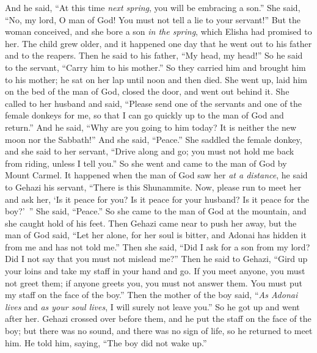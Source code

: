\begin{biblechapter}
\verse And he said, “At this time \textit{next spring}, you will be embracing a son.” She said, “No, my lord, O man of God! You must not tell a lie to your servant!”
\verse But the woman conceived, and she bore a son \textit{in the spring}, which Elisha had promised to her.
 The child grew older, and it happened one day that he went out to his father and to the reapers.
\verse Then he said to his father, “My head, my head!” So he said to the servant, “Carry him to his mother.”
\verse So they carried him and brought him to his mother; he sat on her lap until noon and then died.
\verse She went up, laid him on the bed of the man of God, closed the door, and went out behind it.
\verse She called to her husband and said, “Please send one of the servants and one of the female donkeys for me, so that I can go quickly up to the man of God and return.”
\verse And he said, “Why are you going to him today? It is neither the new moon nor the Sabbath!” And she said, “Peace.”
\verse She saddled the female donkey, and she said to her servant, “Drive along and go; you must not hold me back from riding, unless I tell you.”
\verse So she went and came to the man of God by Mount Carmel. It happened when the man of God saw her \textit{at a distance}, he said to Gehazi his servant, “There is this Shunammite.
\verse Now, please run to meet her and ask her, ‘Is it peace for you? Is it peace for your husband? Is it peace for the boy?’ ” She said, “Peace.”
\verse So she came to the man of God at the mountain, and she caught hold of his feet. Then Gehazi came near to push her away, but the man of God said, “Let her alone, for her soul is bitter, and Adonai has hidden it from me and has not told me.”
\verse Then she said, “Did I ask for a son from my lord? Did I not say that you must not mislead me?”
\verse Then he said to Gehazi, “Gird up your loins and take my staff in your hand and go. If you meet anyone, you must not greet them; if anyone greets you, you must not answer them. You must put my staff on the face of the boy.”
\verse Then the mother of the boy said, “\textit{As Adonai lives} and \textit{as your soul lives}, I will surely not leave you.” So he got up and went after her.
\verse Gehazi crossed over before them, and he put the staff on the face of the boy; but there was no sound, and there was no sign of life, so he returned to meet him. He told him, saying, “The boy did not wake up.”

\end{biblechapter}
